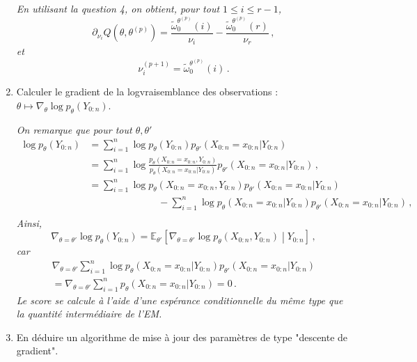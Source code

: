 \documentclass[a4paper,10pt,fleqn]{article}
\newcommand{\1}{\ensuremath{\mathbbm{1}}}
\begin{document}
\begin{enumerate}
\vspace{.2cm}

{\em
En utilisant la question 4, on obtient, pour tout $1\leq i \leq r-1$, 
$$
\partial_{\nu_i}Q(\theta,\theta^{(p)}) = \frac{\tilde\omega_{0}^{\theta^{(p)}}(i)}{\nu_i} - \frac{\tilde\omega_{0}^{\theta^{(p)}}(r)}{\nu_r}\,,
$$
et
$$
\nu_i^{(p+1)} = \tilde\omega_{0}^{\theta^{(p)}}(i)\,.
$$
}
\item Calculer le gradient de la logvraisemblance des observations : $\theta\mapsto\nabla_\theta \log p_\theta(Y_{0:n})$.

\vspace{.2cm}

{\em
On remarque que pour tout $\theta,\theta'$
\begin{align*}
\log p_\theta(Y_{0:n}) &= \sum_{i=1}^n \log p_\theta(Y_{0:n}) p_{\theta'}(X_{0:n} = x_{0:n}|Y_{0:n})\,\\
&= \sum_{i=1}^n \log \frac{p_\theta(X_{0:n} = x_{0:n},Y_{0:n})}{p_\theta(X_{0:n} = x_{0:n}|Y_{0:n})} p_{\theta'}(X_{0:n} = x_{0:n}|Y_{0:n}) \,,\\
&= \sum_{i=1}^n \log p_\theta(X_{0:n} = x_{0:n},Y_{0:n})p_{\theta'}(X_{0:n} = x_{0:n}|Y_{0:n})  \\
&\hspace{3cm}- \sum_{i=1}^n \log p_\theta(X_{0:n} = x_{0:n}|Y_{0:n})p_{\theta'}(X_{0:n} = x_{0:n}|Y_{0:n})\,,\\
\end{align*}
Ainsi,
$$
\nabla_{\theta=\theta'}\log p_\theta(Y_{0:n}) = \mathbb{E}_{\theta'}\left[\nabla_{\theta=\theta'}\log p_\theta(X_{0:n},Y_{0:n}) \middle |Y_{0:n}\right]\,,
$$
car
\begin{multline*}
\nabla_{\theta=\theta'}\sum_{i=1}^n \log p_\theta(X_{0:n} = x_{0:n}|Y_{0:n})p_{\theta'}(X_{0:n} = x_{0:n}|Y_{0:n})\\
=\nabla_{\theta=\theta'}\sum_{i=1}^n p_\theta(X_{0:n} = x_{0:n}|Y_{0:n})  = 0\,.
\end{multline*}
Le score se calcule \`a l'aide d'une esp\'erance conditionnelle du m\^eme type que la quantit\'e interm\'ediaire de l'EM.
}
\item En d\'eduire un algorithme de mise \`a jour des param\`etres de type "descente de gradient".

\vspace{.2cm}


\end{enumerate}
\end{document}
